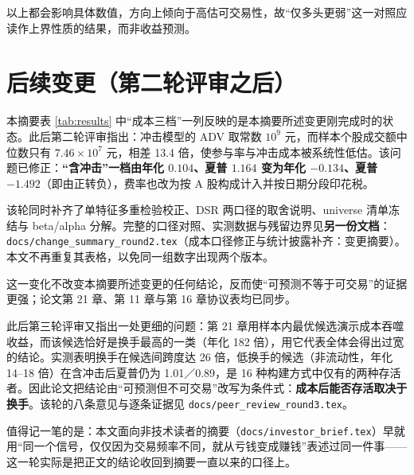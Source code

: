 \documentclass[11pt,a4paper]{ctexart}
\begin{document}
以上都会影响具体数值，方向上倾向于高估可交易性，故“仅多头更弱”这一对照应读作上界性质的结果，而非收益预测。

\section{后续变更（第二轮评审之后）}

本摘要表 \ref{tab:results} 中“成本三档”一列反映的是本摘要所述变更刚完成时的状态。此后第二轮评审指出：冲击模型的 ADV 取常数 $10^9$ 元，而样本个股成交额中位数只有 $7.46\times10^7$ 元，相差 13.4 倍，使参与率与冲击成本被系统性低估。该问题已修正：\textbf{“含冲击”一档由年化 $0.104$、夏普 $1.164$ 变为年化 $-0.134$、夏普 $-1.492$}（即由正转负），费率也改为按 A 股构成计入并按日期分段印花税。

该轮同时补齐了单特征多重检验校正、DSR 两口径的取舍说明、universe 清单冻结与 beta/alpha 分解。完整的口径对照、实测数据与残留边界见\textbf{另一份文档}：\texttt{docs/change\_summary\_round2.tex}（成本口径修正与统计披露补齐：变更摘要）。本文不再重复其表格，以免同一组数字出现两个版本。

这一变化不改变本摘要所述变更的任何结论，反而使“可预测不等于可交易”的证据更强；论文第 21 章、第 11 章与第 16 章协议表均已同步。

\medskip

\noindent 此后第三轮评审又指出一处更细的问题：第 21 章用样本内最优候选演示成本吞噬收益，而该候选恰好是换手最高的一类（年化 182 倍），用它代表全体会得出过宽的结论。实测表明换手在候选间跨度达 26 倍，低换手的候选（非流动性，年化 14--18 倍）在含冲击后夏普仍为 1.01／0.89，是 16 种构建方式中仅有的两种存活者。因此论文把结论由“可预测但不可交易”改写为条件式：\textbf{成本后能否存活取决于换手}。该轮的八条意见与逐条证据见 \texttt{docs/peer\_review\_round3.tex}。

值得记一笔的是：本文面向非技术读者的摘要（\texttt{docs/investor\_brief.tex}）早就用“同一个信号，仅仅因为交易频率不同，就从亏钱变成赚钱”表述过同一件事——这一轮实际是把正文的结论收回到摘要一直以来的口径上。
\end{document}

